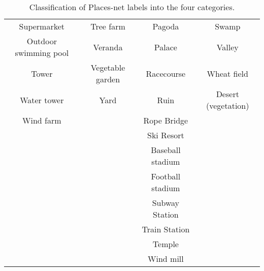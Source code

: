 \begin{table}[htb!]
\begin{tabular}{ |c|c|c|c| }
        Supermarket & Tree farm & Pagoda & Swamp \\
        Outdoor swimming pool & Veranda & Palace & Valley \\
        Tower & Vegetable garden  & Racecourse & Wheat field \\
        Water tower & Yard & Ruin & Desert (vegetation) \\
        Wind farm &  & Rope Bridge & \\
         &  & Ski Resort & \\
         &  & Baseball stadium & \\
         &  & Football stadium & \\
         &  & Subway Station & \\
         &  & Train Station & \\
         &  & Temple & \\
         &  & Wind mill & \\
        \hline
    \end{tabular}
    \caption{Classification of Places-net labels into the four categories.}
    \label{tab:PlacesLabels}
\end{table}